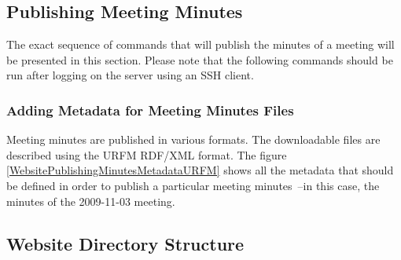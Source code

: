 \subsection{Publishing Meeting Minutes}\label{WebsitePublishingMinutes}
The exact sequence of commands that will publish the minutes of a
meeting will be presented in this section. Please note that the following
commands should be run after logging on the server using an SSH client.

\subsubsection{Adding Metadata for Meeting Minutes Files}\label{WebsitePublishingMinutesMetadata}

Meeting minutes are published in various formats. The downloadable files
are described using the URFM RDF/XML format. 
The figure \ref{WebsitePublishingMinutesMetadataURFM} shows all the 
metadata that should be defined in order to publish a particular meeting
minutes~--in this case, the minutes of the 2009-11-03 meeting.

\subsection{Website Directory Structure}\label{WebsiteDirectoryStructure}

